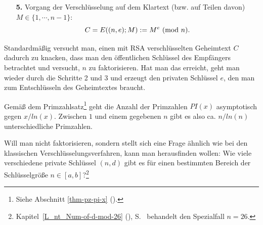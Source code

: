 \begin{refsegment}
\begin{itemize}
  \item[\textbf{5.}] Vorgang der Verschlüsselung auf dem Klartext (bzw. auf Teilen davon)
                  $M \in \{1, \cdots, n-1\}$:
                  $$C = E ( (n, e); M ) := M^e {\rm ~(mod~} n).$$
\end{itemize}

Standardmäßig versucht man, einen mit RSA verschlüsselten Geheimtext $C$
dadurch zu knacken, dass man den öffentlichen Schlüssel des Empfängers
betrachtet und versucht, $n$ zu faktorisieren. Hat man das erreicht, geht man
wieder durch die Schritte 2 und 3 und erzeugt den privaten Schlüssel $e$, den
man zum Entschlüsseln des Geheimtextes braucht.

Gemäß dem \glqq Primzahlsatz\grqq\footnote{%
Siehe Abschnitt \ref{thm-pz-pi-x} \glqq (\grqq).
}
geht die Anzahl der Primzahlen $PI(x)$ asymptotisch gegen $x / ln(x)$.
Zwischen $1$ und einem gegebenen $n$ gibt es also ca. $n / ln(n)$ unterschiedliche
Primzahlen.

 Will man nicht faktorisieren, sondern stellt sich eine Frage ähnlich
wie bei den klassischen Verschlüsselungsverfahren, kann man herausfinden wollen:
Wie viele verschiedene private Schlüssel $(n, d)$ gibt es für einen bestimmten
Bereich der Schlüsselgröße $n \in [a, b]$?\footnote{%
Kapitel~\ref{L_nt_Num-of-d-mod-26} (\glqq {}\grqq),
S.~\pageref{L_nt_Num-of-d-mod-26} behandelt den Spezialfall $n=26$.
}


\end{refsegment}
